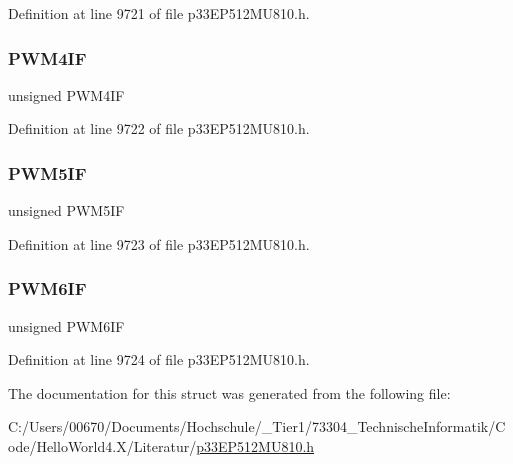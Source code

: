 Definition at line 9721 of file p33\+E\+P512\+M\+U810.\+h.

\mbox{\label{structtag_i_f_s6_b_i_t_s_a83efaaa306f3090127a9c3e179863fd6}} 
\subsubsection{\texorpdfstring{P\+W\+M4\+IF}{PWM4IF}}
{\footnotesize\ttfamily unsigned P\+W\+M4\+IF}



Definition at line 9722 of file p33\+E\+P512\+M\+U810.\+h.

\mbox{\label{structtag_i_f_s6_b_i_t_s_a06e63b53352db7e390f6c2fda5340eb2}} 
\subsubsection{\texorpdfstring{P\+W\+M5\+IF}{PWM5IF}}
{\footnotesize\ttfamily unsigned P\+W\+M5\+IF}



Definition at line 9723 of file p33\+E\+P512\+M\+U810.\+h.

\mbox{\label{structtag_i_f_s6_b_i_t_s_a12e009af41dbbeb71fc73d842bd93489}} 
\subsubsection{\texorpdfstring{P\+W\+M6\+IF}{PWM6IF}}
{\footnotesize\ttfamily unsigned P\+W\+M6\+IF}



Definition at line 9724 of file p33\+E\+P512\+M\+U810.\+h.



The documentation for this struct was generated from the following file\+:\begin{DoxyCompactItemize}
\item 
C\+:/\+Users/00670/\+Documents/\+Hochschule/\+\_\+\+Tier1/73304\+\_\+\+Technische\+Informatik/\+Code/\+Hello\+World4.\+X/\+Literatur/\hyperlink{p33_e_p512_m_u810_8h}{p33\+E\+P512\+M\+U810.\+h}\end{DoxyCompactItemize}
